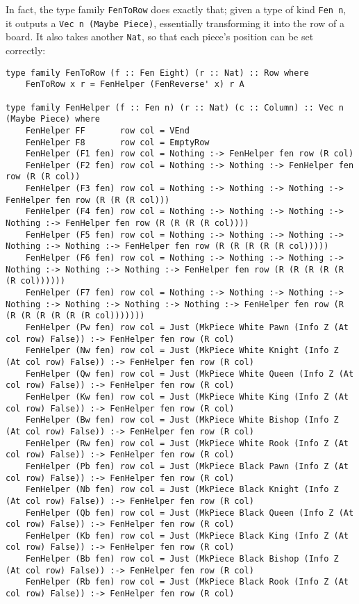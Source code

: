 \documentclass[12pt, a4paper, bibliography=totocnumbered]{scrreprt}
\newcommand{\inline}[1]{\lstinline[basicstyle=\ttfamily\footnotesize]{#1}}
\begin{document}
In fact, the type family \inline{FenToRow} does exactly that; given a type of kind \inline{Fen n}, it outputs a \inline{Vec n (Maybe Piece)}, essentially transforming it into the row of a board. It also takes another \inline{Nat}, so that each piece's position can be set correctly:

\begin{lstlisting}
type family FenToRow (f :: Fen Eight) (r :: Nat) :: Row where
    FenToRow x r = FenHelper (FenReverse' x) r A

type family FenHelper (f :: Fen n) (r :: Nat) (c :: Column) :: Vec n (Maybe Piece) where
    FenHelper FF       row col = VEnd
    FenHelper F8       row col = EmptyRow
    FenHelper (F1 fen) row col = Nothing :-> FenHelper fen row (R col)
    FenHelper (F2 fen) row col = Nothing :-> Nothing :-> FenHelper fen row (R (R col))
    FenHelper (F3 fen) row col = Nothing :-> Nothing :-> Nothing :-> FenHelper fen row (R (R (R col)))
    FenHelper (F4 fen) row col = Nothing :-> Nothing :-> Nothing :-> Nothing :-> FenHelper fen row (R (R (R (R col))))
    FenHelper (F5 fen) row col = Nothing :-> Nothing :-> Nothing :-> Nothing :-> Nothing :-> FenHelper fen row (R (R (R (R (R col)))))
    FenHelper (F6 fen) row col = Nothing :-> Nothing :-> Nothing :-> Nothing :-> Nothing :-> Nothing :-> FenHelper fen row (R (R (R (R (R (R col))))))
    FenHelper (F7 fen) row col = Nothing :-> Nothing :-> Nothing :-> Nothing :-> Nothing :-> Nothing :-> Nothing :-> FenHelper fen row (R (R (R (R (R (R (R col)))))))
    FenHelper (Pw fen) row col = Just (MkPiece White Pawn (Info Z (At col row) False)) :-> FenHelper fen row (R col)
    FenHelper (Nw fen) row col = Just (MkPiece White Knight (Info Z (At col row) False)) :-> FenHelper fen row (R col)
    FenHelper (Qw fen) row col = Just (MkPiece White Queen (Info Z (At col row) False)) :-> FenHelper fen row (R col)
    FenHelper (Kw fen) row col = Just (MkPiece White King (Info Z (At col row) False)) :-> FenHelper fen row (R col)
    FenHelper (Bw fen) row col = Just (MkPiece White Bishop (Info Z (At col row) False)) :-> FenHelper fen row (R col)
    FenHelper (Rw fen) row col = Just (MkPiece White Rook (Info Z (At col row) False)) :-> FenHelper fen row (R col)
    FenHelper (Pb fen) row col = Just (MkPiece Black Pawn (Info Z (At col row) False)) :-> FenHelper fen row (R col)
    FenHelper (Nb fen) row col = Just (MkPiece Black Knight (Info Z (At col row) False)) :-> FenHelper fen row (R col)
    FenHelper (Qb fen) row col = Just (MkPiece Black Queen (Info Z (At col row) False)) :-> FenHelper fen row (R col)
    FenHelper (Kb fen) row col = Just (MkPiece Black King (Info Z (At col row) False)) :-> FenHelper fen row (R col)
    FenHelper (Bb fen) row col = Just (MkPiece Black Bishop (Info Z (At col row) False)) :-> FenHelper fen row (R col)
    FenHelper (Rb fen) row col = Just (MkPiece Black Rook (Info Z (At col row) False)) :-> FenHelper fen row (R col)
\end{lstlisting}
\end{document}
